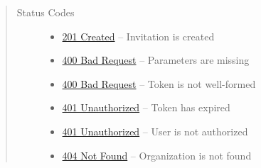 \documentclass[letterpaper,10pt,english]{sphinxmanual}
\begin{document}
\begin{fulllineitems}
\begin{quote}
\begin{description}
\begin{itemize}
\end{itemize}

\item[{Status Codes}] \leavevmode\begin{itemize}
\item {} 
\href{http://www.w3.org/Protocols/rfc2616/rfc2616-sec10.html\#sec10.2.2}{201 Created} -- Invitation is created

\item {} 
\href{http://www.w3.org/Protocols/rfc2616/rfc2616-sec10.html\#sec10.4.1}{400 Bad Request} -- Parameters are missing

\item {} 
\href{http://www.w3.org/Protocols/rfc2616/rfc2616-sec10.html\#sec10.4.1}{400 Bad Request} -- Token is not well-formed

\item {} 
\href{http://www.w3.org/Protocols/rfc2616/rfc2616-sec10.html\#sec10.4.2}{401 Unauthorized} -- Token has expired

\item {} 
\href{http://www.w3.org/Protocols/rfc2616/rfc2616-sec10.html\#sec10.4.2}{401 Unauthorized} -- User is not authorized

\item {} 
\href{http://www.w3.org/Protocols/rfc2616/rfc2616-sec10.html\#sec10.4.5}{404 Not Found} -- Organization is not found

\end{itemize}

\end{description}\end{quote}

\end{fulllineitems}
\end{document}
